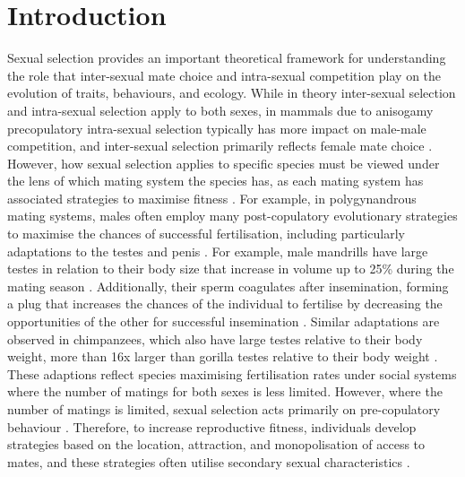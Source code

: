 \section{Introduction}
Sexual selection provides an important theoretical framework for understanding the role that inter-sexual mate choice and intra-sexual competition play on the evolution of traits, behaviours, and ecology. While in theory inter-sexual selection and intra-sexual selection apply to both sexes, in mammals due to anisogamy precopulatory intra-sexual selection typically has more impact on male-male competition, and inter-sexual selection primarily reflects female mate choice \citep{Andersson.1996}. However, how sexual selection applies to specific species must be viewed under the lens of which mating system the species has, as each mating system has associated strategies to maximise fitness \citep{Kappeler.2004}. For example, in polygynandrous mating systems, males often employ many post-copulatory evolutionary strategies to maximise the chances of successful fertilisation, including particularly adaptations to the testes and penis \citep{Ros-Santaella.2015}. For example, male mandrills have large testes in relation to their body size that increase in volume up to 25\% during the mating season \citep{Setchell.2001}. Additionally, their sperm coagulates after insemination, forming a plug that increases the chances of the individual to fertilise by decreasing the opportunities of the other for successful insemination \citep{Setchell.2016}. Similar adaptations are observed in chimpanzees, which also have large testes relative to their body weight, more than 16x larger than gorilla testes relative to their body weight \citep{Dixsonwr}. These adaptions reflect species maximising fertilisation rates under social systems where the number of matings for both sexes is less limited. However, where the number of matings is limited, sexual selection acts primarily on pre-copulatory behaviour \citep{Andersson.1996, Cassini.2020}. Therefore, to increase reproductive fitness, individuals develop strategies based on the location, attraction, and monopolisation of access to mates, and these strategies often utilise secondary sexual characteristics \citep{Kappeler.2004}. 

